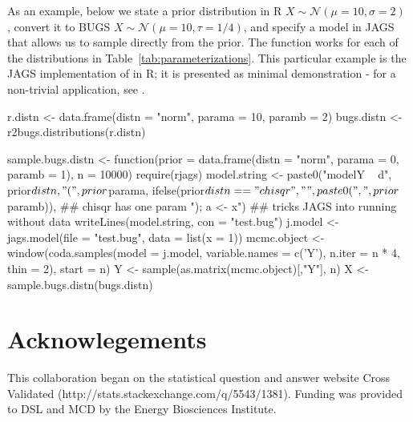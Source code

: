 As an example, below we state a prior distribution in R $X \sim \mathcal{N}(\mu=10,\sigma=2)$ , convert it to BUGS  $X \sim \mathcal{N}(\mu=10,\tau=1/4)$, and specify a model in JAGS that allows us to sample directly from the prior. 
The function works for each of the distributions in Table~\ref{tab:parameterizations}. 
This particular example is the JAGS implementation of  in R; it is presented as minimal demonstration - for a non-trivial application, see \cite{lebauer2012ffb}. 

\begin{example}

r.distn <- data.frame(distn = "norm", parama = 10, paramb = 2)
bugs.distn <- r2bugs.distributions(r.distn)
   
sample.bugs.distn <- function(prior = data.frame(distn = "norm", parama = 0, paramb = 1), n = 10000) {
  require(rjags)
  model.string <- paste0("model{Y ~ d", prior$distn, "(", prior$parama, 
                         ifelse(prior$distn == "chisqr", "", paste0(", ", prior$paramb)), ## chisqr has one param
                         "); a <- x}")  ## tricks JAGS into running without data  
  writeLines(model.string, con = "test.bug")
  j.model  <- jags.model(file = "test.bug", data = list(x = 1))
  mcmc.object <- window(coda.samples(model = j.model, variable.names = c('Y'), n.iter = n * 4, thin = 2),
                        start = n)
  Y <- sample(as.matrix(mcmc.object)[,"Y"], n)
}
X <- sample.bugs.distn(bugs.distn)
\end{example}

\section{Acknowlegements}

This collaboration began on the statistical question and answer website Cross Validated (http://stats.stackexchange.com/q/5543/1381). Funding was provided to DSL and MCD by the Energy Biosciences Institute.




\address{David S. LeBauer\\
Energy Biosciences Institute\\
University of Illinois
USA}\\

\address{Michael C. Dietze\\
Department of Earth And Environment\\
Boston University\\
USA}

\address{Ben M. Bolker\\
Department of Mathematics and Statistics\\
McMaster University\\
Canada}

